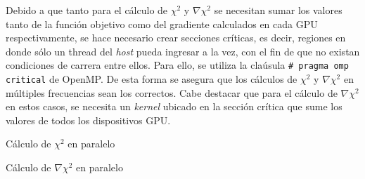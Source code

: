 Debido a que tanto para el cálculo de $\chi^{2}$ y $\nabla \chi^{2}$ se necesitan sumar los valores tanto de la función objetivo como del gradiente calculados en cada GPU respectivamente, se hace necesario crear  secciones críticas, es decir, regiones en donde sólo un thread del \textit{host} pueda ingresar a la vez, con el fin de que no existan condiciones de carrera entre ellos. Para ello, se utiliza la claúsula \texttt{\# pragma omp critical} de OpenMP. De esta forma se asegura que los cálculos de $\chi^{2}$ y $\nabla \chi^{2}$ en múltiples frecuencias sean los correctos. Cabe destacar que para el cálculo de $\nabla \chi^{2}$ en estos casos, se necesita un \textit{kernel} ubicado en la sección crítica que sume los valores de todos los dispositivos GPU.


\renewcommand{\algorithmicdo}{\textbf{do in parallel}}

\begin{algorithm}
	\begin{algorithmic}[1]
    \ENDFOR
	\end{algorithmic}
	\caption{Cálculo de $\chi^{2}$ en paralelo}
	\label{alg:chi2openmp}
\end{algorithm}

\begin{algorithm}
	\begin{algorithmic}[1]
    \ENDFOR
	\end{algorithmic}
	\caption{Cálculo de $\nabla \chi^{2}$ en paralelo}
	\label{alg:chi2openmp}
\end{algorithm}

\renewcommand{\algorithmicdo}{\textbf{do}}
